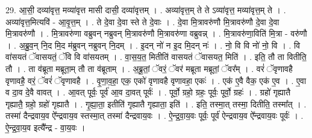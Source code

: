 \documentclass[17pt]{extarticle}
\begin{document}
29. आ॒सी॒ दव्या॑वृत्त॒ मव्या॑वृत्त मासी दासी॒ दव्या॑वृत्तम् । . अव्या॑वृत्त॒म् ते ते ऽव्या॑वृत्त॒ मव्या॑वृत्त॒म् ते । . अव्या॑वृत्त॒मित्यवि॑ - आ॒वृ॒त्त॒म् । . ते दे॒वा दे॒वा स्ते ते दे॒वाः । . दे॒वा मि॒त्रावरु॑णौ मि॒त्रावरु॑णौ दे॒वा दे॒वा मि॒त्रावरु॑णौ । . मि॒त्रावरु॑णा वब्रुवन् नब्रुवन् मि॒त्रावरु॑णौ मि॒त्रावरु॑णा वब्रुवन्न् । . मि॒त्रावरु॑णा॒विति॑ मि॒त्रा - वरु॑णौ । . अ॒ब्रु॒व॒न् नि॒द मि॒द म॑ब्रुवन् नब्रुवन् नि॒दम् । . इ॒दन् नो॑ न इ॒द मि॒दन् नः॑ । . नो॒ वि वि नो॑ नो॒ वि । . वि वा॑सयतं ॅवासयतं॒ ॅवि वि वा॑सयतम् । . वा॒स॒य॒त॒ मितीति॑ वासयतं ॅवासयत॒ मिति॑ । . इति॒ तौ ता वितीति॒ तौ । . ता व॑ब्रूता मब्रूता॒म् तौ ता व॑ब्रूताम् । . अ॒ब्रू॒तां॒ ॅवरं॒ ॅवर॑ मब्रूता मब्रूतां॒ ॅवर᳚म् । . वरं॑ ॅवृणावहै वृणावहै॒ वरं॒ ॅवरं॑ ॅवृणावहै । . वृ॒णा॒व॒हा॒ एक॒ एको॑ वृणावहै वृणावहा॒ एकः॑ । . एक॑ ए॒वै वैक॒ एक॑ ए॒व । . ए॒वा व दा॒व दे॒वै वावत् । . आ॒वत् पूर्वः॒ पूर्व॑ आ॒व दा॒वत् पूर्वः॑ । . पूर्वो॒ ग्रहो॒ ग्रहः॒ पूर्वः॒ पूर्वो॒ ग्रहः॑ । . ग्रहो॑ गृह्यातै गृह्यातै॒ ग्रहो॒ ग्रहो॑ गृह्यातै । . गृ॒ह्या॒ता॒ इतीति॑ गृह्यातै गृह्याता॒ इति॑ । . इति॒ तस्मा॒त् तस्मा॒ दितीति॒ तस्मा᳚त् । . तस्मा॑ दैन्द्रवाय॒व ऐ᳚न्द्रवाय॒व स्तस्मा॒त् तस्मा॑ दैन्द्रवाय॒वः । . ऐ॒न्द्र॒वा॒य॒वः पूर्वः॒ पूर्व॑ ऐन्द्रवाय॒व ऐ᳚न्द्रवाय॒वः पूर्वः॑ । . ऐ॒न्द्र॒वा॒य॒व इत्यै᳚न्द्र - वा॒य॒वः । \newline
\end{document}
